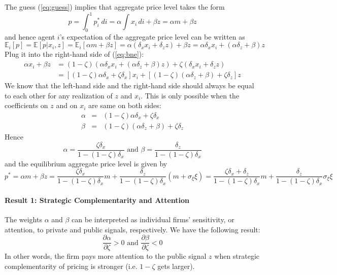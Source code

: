 \documentclass[12pt]{article}
\begin{document}
The guess (\ref{eq:guess}) implies that aggregate price level takes the form
\[p = \int_0^1 p^*_i \, di = \alpha \int x_i \, di + \beta z = \alpha m + \beta z\]
and hence agent $i$'s expectation of the aggregate price level can be written as
\[\mathbb{E}_i[p] = \mathbb{E}[p|x_i, z] = \mathbb{E}_i[\alpha m + \beta z] = \alpha (\delta_x x_i + \delta_z z) + \beta z = \alpha \delta_x x_i + (\alpha \delta_z + \beta)z\]
Plug it into the right-hand side of (\ref{eq:bne}):
\begin{align*}
	\alpha x_i + \beta z & = (1-\zeta) (\alpha \delta_x x_i + (\alpha \delta_z + \beta)z) + \zeta  (\delta_x x_i + \delta_z z) \\
	& = \left[(1-\zeta) \alpha \delta_x + \zeta \delta_x\right] x_i + \left[(1-\zeta)(\alpha \delta_z + \beta) + \zeta \delta_z \right] z 
\end{align*}
We know that the left-hand side and the right-hand side should always be equal to each other for any realization of $z$ and $x_i$. This is only possible when the coefficients on $z$ and on $x_i$ are same on both sides:
\begin{eqnarray*}
	\alpha &=& (1-\zeta) \alpha \delta_x + \zeta \delta_x \\
	\beta &=& (1-\zeta) (\alpha \delta_z + \beta) + \zeta \delta_z
\end{eqnarray*}
Hence
\begin{equation}
	\alpha = \frac{\zeta \delta_x}{1 - (1-\zeta) \delta_x} \text{ and } \beta = \frac{\delta_z}{1 - (1-\zeta) \delta_x }
\end{equation}
and the equilibrium aggregate price level is given by
\begin{equation} \label{eq:eqm_price}
	p^* = \alpha m + \beta z = \frac{\zeta \delta_x}{1 - (1-\zeta) \delta_x} m + \frac{\delta_z}{1 - (1-\zeta) \delta_x } (m + \sigma_\xi \xi) = \frac{\zeta \delta_x + \delta_z}{1 - (1-\zeta) \delta_x} m + \frac{\delta_z}{1 - (1-\zeta) \delta_x }\sigma_\xi \xi
\end{equation}

\paragraph{Result 1: Strategic Complementarity and Attention \\ [6pt]}

The weights $\alpha$ and $\beta$ can be interpreted as individual firms' sensitivity, or attention, to private and public signals, respectively. We have the following result:
\begin{equation}
	\frac{\partial \alpha}{\partial \zeta} > 0 \text{ and } \frac{\partial \beta}{\partial \zeta} < 0
\end{equation}
In other words, the firm pays more attention to the public signal $z$ when strategic complementarity of pricing is stronger (i.e. $1-\zeta$ gets larger). 
\end{document}
